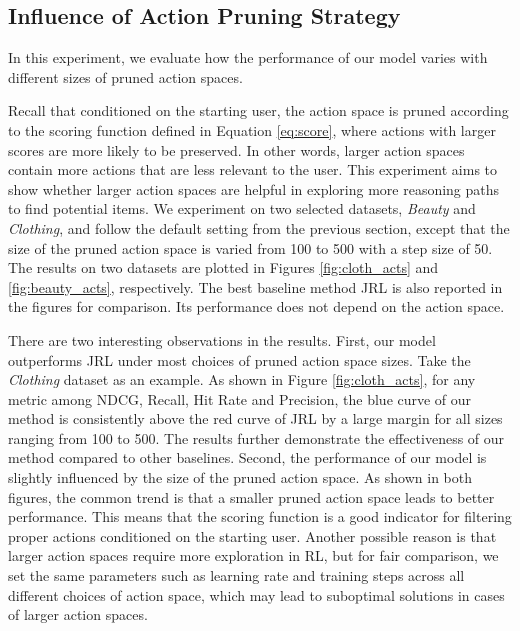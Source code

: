 \documentclass[sigconf]{acmart}
\begin{document}
\subsection{Influence of Action Pruning Strategy}\label{sec:act}
In this experiment, we evaluate how the performance of our model varies with different sizes of pruned action spaces.

Recall that conditioned on the starting user, the action space is pruned according to the scoring function defined in Equation \ref{eq:score}, where actions with larger scores are more likely to be preserved.
In other words, larger action spaces contain more actions that are less relevant to the user.
This experiment aims to show whether larger action spaces are helpful in exploring more reasoning paths to find potential items.
We experiment on two selected datasets, \emph{Beauty} and \emph{Clothing}, and follow the default setting from the previous section, except that the size of the pruned action space is varied from 100 to 500 with a step size of 50.
The results on two datasets are plotted in Figures \ref{fig:cloth_acts} and \ref{fig:beauty_acts}, respectively.
The best baseline method JRL is also reported in the figures for comparison. Its performance does not depend on the action space.

There are two interesting observations in the results.
First, our model outperforms JRL under most choices of pruned action space sizes. 
Take the \emph{Clothing} dataset as an example. As shown in Figure \ref{fig:cloth_acts}, for any metric among NDCG, Recall, Hit Rate and Precision, the blue curve of our method is consistently above the red curve of JRL by a large margin for all sizes ranging from 100 to 500.
The results further demonstrate the effectiveness of our method compared to other baselines.
Second, the performance of our model is slightly influenced by the size of the pruned action space. 
As shown in both figures, the common trend is that a smaller pruned action space leads to better performance. This means that the scoring function is a good indicator for filtering proper actions conditioned on the starting user. Another possible reason is that larger action spaces require more exploration in RL, but for fair comparison, we set the same parameters such as learning rate and training steps across all different choices of action space, which may lead to suboptimal solutions in  cases of larger action spaces.
\end{document}
